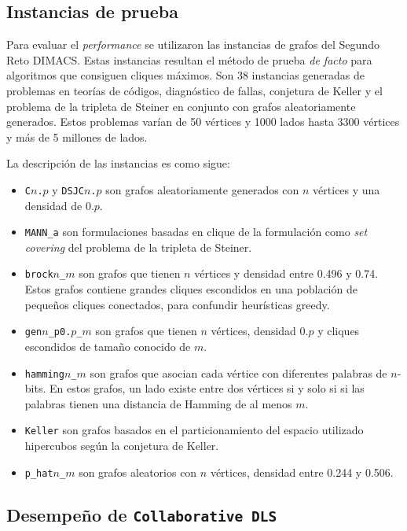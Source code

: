 \documentclass[conference]{IEEEtran}
\begin{document}
\subsection{Instancias de prueba}
\label{sec:instances}

Para evaluar el \emph{performance} se utilizaron las instancias de
grafos del Segundo Reto DIMACS. Estas instancias resultan el método de
prueba \emph{de facto} para algoritmos que consiguen cliques
máximos. Son 38 instancias generadas de problemas en teorías de
códigos, diagnóstico de fallas, conjetura de Keller y el problema de
la tripleta de Steiner en conjunto con grafos aleatoriamente
generados.  Estos problemas varían de 50 vértices y 1000 lados hasta
3300 vértices y más de 5 millones de lados.

La descripción de las instancias es como sigue:

\begin{itemize}
\item \texttt{C$n$.$p$} y \texttt{DSJC$n$.$p$} son grafos
  aleatoriamente generados con $n$ vértices y una densidad de $0.p$.

\item \texttt{MANN\_a} son formulaciones basadas en clique de la
  formulación como \emph{set covering} del problema de la tripleta de
  Steiner.
\item \texttt{brock$n$\_$m$} son grafos que tienen $n$ vértices y
  densidad entre 0.496 y 0.74.  Estos grafos contiene grandes cliques
  escondidos en una población de pequeños cliques conectados, para
  confundir heurísticas greedy.
\item \texttt{gen$n$\_p0.$p$\_$m$} son grafos que tienen $n$ vértices,
  densidad $0.p$ y cliques escondidos de tamaño conocido de $m$.

\item \texttt{hamming$n$\_$m$} son grafos que asocian cada vértice con
  diferentes palabras de $n$-bits. En estos grafos, un lado existe
  entre dos vértices si y solo si si las palabras tienen una distancia
  de Hamming de al menos $m$.
\item \texttt{Keller} son grafos basados en el particionamiento del
  espacio utilizado hipercubos según la conjetura de Keller.
\item \texttt{p\_hat$n$\_$m$} son grafos aleatorios con $n$ vértices,
  densidad entre 0.244 y 0.506.

\end{itemize}

\subsection{Desempeño de \texttt{Collaborative DLS}}
\label{sec:dls_res}
\end{document}
